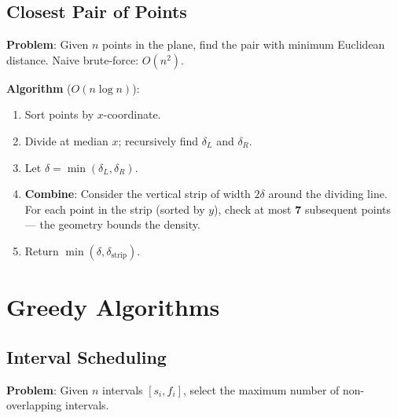 \documentclass[oneside]{book}
\begin{document}

\subsection*{Closest Pair of Points}

\textbf{Problem}: Given $n$ points in the plane, find the pair with minimum Euclidean distance.
Naive brute-force: $O(n^2)$.

\textbf{Algorithm} ($O(n \log n)$):
\begin{enumerate}
    \item Sort points by $x$-coordinate.
    \item Divide at median $x$; recursively find $\delta_L$ and $\delta_R$.
    \item Let $\delta = \min(\delta_L, \delta_R)$.
    \item \textbf{Combine}: Consider the vertical strip of width $2\delta$ around the
          dividing line. For each point in the strip (sorted by $y$), check at most
          \textbf{7} subsequent points — the geometry bounds the density.
    \item Return $\min(\delta, \delta_{\text{strip}})$.
\end{enumerate}


\section{Greedy Algorithms}


\subsection*{Interval Scheduling}

\textbf{Problem}: Given $n$ intervals $[s_i, f_i]$, select the maximum number of
non-overlapping intervals.
\end{document}
